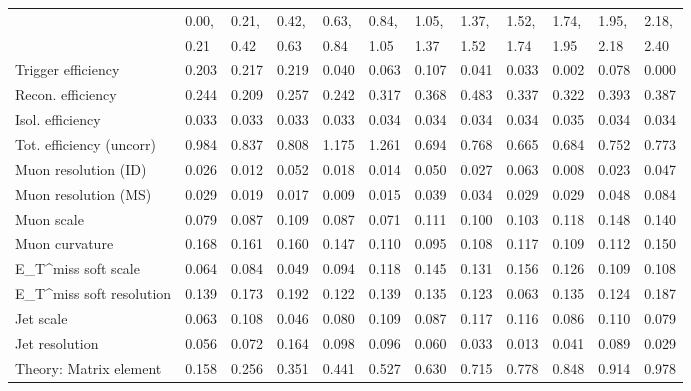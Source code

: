 \begin{tabular}{l|p{0.6cm}p{0.6cm}p{0.6cm}p{0.6cm}p{0.6cm}p{0.6cm}p{0.6cm}p{0.6cm}p{0.6cm}p{0.6cm}p{0.6cm}}
\hline
   & 0.00, & 0.21, & 0.42, & 0.63, & 0.84, & 1.05, & 1.37, & 1.52, & 1.74, & 1.95, & 2.18,  \\ 
   & 0.21 & 0.42 & 0.63 & 0.84 & 1.05 & 1.37 & 1.52 & 1.74 & 1.95 & 2.18 & 2.40  \\ 
\hline
Trigger efficiency                       & 0.203 & 0.217 & 0.219 & 0.040 & 0.063 & 0.107 & 0.041 & 0.033 & 0.002 & 0.078 & 0.000 \\
Recon. efficiency                        & 0.244 & 0.209 & 0.257 & 0.242 & 0.317 & 0.368 & 0.483 & 0.337 & 0.322 & 0.393 & 0.387 \\
Isol. efficiency                         & 0.033 & 0.033 & 0.033 & 0.033 & 0.034 & 0.034 & 0.034 & 0.034 & 0.035 & 0.034 & 0.034 \\
Tot. efficiency (uncorr)                 & 0.984 & 0.837 & 0.808 & 1.175 & 1.261 & 0.694 & 0.768 & 0.665 & 0.684 & 0.752 & 0.773 \\
Muon resolution (ID)                     & 0.026 & 0.012 & 0.052 & 0.018 & 0.014 & 0.050 & 0.027 & 0.063 & 0.008 & 0.023 & 0.047 \\
Muon resolution (MS)                     & 0.029 & 0.019 & 0.017 & 0.009 & 0.015 & 0.039 & 0.034 & 0.029 & 0.029 & 0.048 & 0.084 \\
Muon scale                               & 0.079 & 0.087 & 0.109 & 0.087 & 0.071 & 0.111 & 0.100 & 0.103 & 0.118 & 0.148 & 0.140 \\
Muon curvature                           & 0.168 & 0.161 & 0.160 & 0.147 & 0.110 & 0.095 & 0.108 & 0.117 & 0.109 & 0.112 & 0.150 \\
E_{T}^{miss} soft scale                  & 0.064 & 0.084 & 0.049 & 0.094 & 0.118 & 0.145 & 0.131 & 0.156 & 0.126 & 0.109 & 0.108 \\
E_{T}^{miss} soft resolution             & 0.139 & 0.173 & 0.192 & 0.122 & 0.139 & 0.135 & 0.123 & 0.063 & 0.135 & 0.124 & 0.187 \\
Jet scale                                & 0.063 & 0.108 & 0.046 & 0.080 & 0.109 & 0.087 & 0.117 & 0.116 & 0.086 & 0.110 & 0.079 \\
Jet resolution                           & 0.056 & 0.072 & 0.164 & 0.098 & 0.096 & 0.060 & 0.033 & 0.013 & 0.041 & 0.089 & 0.029 \\
Theory: Matrix element                   & 0.158 & 0.256 & 0.351 & 0.441 & 0.527 & 0.630 & 0.715 & 0.778 & 0.848 & 0.914 & 0.978 \\

\end{tabular}

